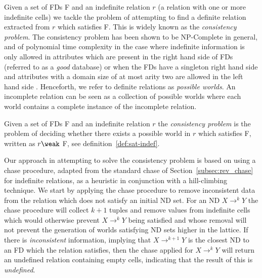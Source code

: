 Given a set of FDs F and an indefinite relation $r$ (a relation with one or
more indefinite cells) we tackle the problem of attempting
to find a definite relation extracted from $r$ which satisfies F.
This is widely known as the {\em consistency problem}.  
The consistency
problem has been shown to be NP-Complete in general, and of 
polynomial time complexity in the case where indefinite information is
only allowed in attributes which are present in the right hand side of
FDs (referred to as a {\em good} database) or when the FDs have a
singleton right hand side and attributes with a domain size of
at most arity two are allowed in the left hand side \cite{vn95}. 
 Henceforth, we refer to definite relations as {\em possible worlds}.
An incomplete relation can be seen as a collection of possible worlds
where each world contains a complete instance of the incomplete
relation. 
\begin{definition}\label{def:cons}
\begin{rm}
Given a set of FDs F and an indefinite relation $r$ the {\em consistency problem}
is the problem of deciding whether there exists a possible world in
$r$ which satisfies F, written as $r \weak$ F, see definition~\ref{def:sat-indef}. 
\end{rm}
\end{definition}


Our approach in attempting to solve the consistency problem is based on using
a chase procedure, adapted from the standard chase of
Section~\ref{subsec:rev_chase} for indefinite relations, as a
heuristic in conjunction with a hill-climbing 
technique. We start by applying the chase procedure to remove
inconsistent data from the relation which does not satisfy an
initial ND set. For an ND $X \to^k Y$ the chase procedure will
collect $k + 1$ tuples and remove values from indefinite cells
which would otherwise prevent $X \to^k Y$ being satisfied and whose
removal will not prevent the generation of worlds satisfying ND sets
higher in the lattice.
If there is {\em inconsistent} information, implying that 
$X \to^{k+1} Y$ is
the closest ND to an FD which the relation satisfies, then the
chase applied for $X \to^k Y$ will return an undefined relation
containing empty cells, indicating that the result of this is {\em undefined}.

\smallskip

